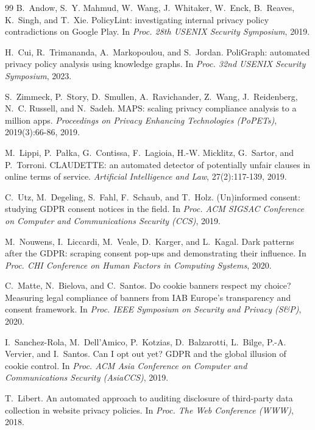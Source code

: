 \documentclass[11pt]{article}
\begin{document}
\begin{thebibliography}{99}
B.~Andow, S.~Y. Mahmud, W.~Wang, J.~Whitaker, W.~Enck, B.~Reaves, K.~Singh, and
T.~Xie.
PolicyLint: investigating internal privacy policy contradictions on Google Play.
In \emph{Proc. 28th USENIX Security Symposium}, 2019.

H.~Cui, R.~Trimananda, A.~Markopoulou, and S.~Jordan.
PoliGraph: automated privacy policy analysis using knowledge graphs.
In \emph{Proc. 32nd USENIX Security Symposium}, 2023.

S.~Zimmeck, P.~Story, D.~Smullen, A.~Ravichander, Z.~Wang, J.~Reidenberg,
N.~C. Russell, and N.~Sadeh.
MAPS: scaling privacy compliance analysis to a million apps.
\emph{Proceedings on Privacy Enhancing Technologies (PoPETs)}, 2019(3):66-86,
2019.

M.~Lippi, P.~Pa\l{}ka, G.~Contissa, F.~Lagioia, H.-W. Micklitz, G.~Sartor, and
P.~Torroni.
CLAUDETTE: an automated detector of potentially unfair clauses in online terms
of service.
\emph{Artificial Intelligence and Law}, 27(2):117-139, 2019.

C.~Utz, M.~Degeling, S.~Fahl, F.~Schaub, and T.~Holz.
(Un)informed consent: studying GDPR consent notices in the field.
In \emph{Proc. ACM SIGSAC Conference on Computer and Communications Security
(CCS)}, 2019.

M.~Nouwens, I.~Liccardi, M.~Veale, D.~Karger, and L.~Kagal.
Dark patterns after the GDPR: scraping consent pop-ups and demonstrating their
influence.
In \emph{Proc. CHI Conference on Human Factors in Computing Systems}, 2020.

C.~Matte, N.~Bielova, and C.~Santos.
Do cookie banners respect my choice? Measuring legal compliance of banners from
IAB Europe's transparency and consent framework.
In \emph{Proc. IEEE Symposium on Security and Privacy (S\&P)}, 2020.

I.~Sanchez-Rola, M.~Dell'Amico, P.~Kotzias, D.~Balzarotti, L.~Bilge,
P.-A. Vervier, and I.~Santos.
Can I opt out yet? GDPR and the global illusion of cookie control.
In \emph{Proc. ACM Asia Conference on Computer and Communications Security
(AsiaCCS)}, 2019.

T.~Libert.
An automated approach to auditing disclosure of third-party data collection in
website privacy policies.
In \emph{Proc. The Web Conference (WWW)}, 2018.


\end{thebibliography}
\end{document}
